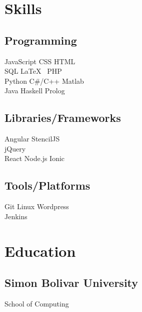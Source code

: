 \documentclass[]{plushcv}
\begin{document}
\begin{minipage}[t]{0.25\textwidth} 


\section{Skills}

\subsection{Programming}
\sectionsep
{}
JavaScript \textbullet{} CSS \textbullet{} HTML \\
\sectionsep
{}
SQL \textbullet{} \LaTeX\ \textbullet{} PHP \\
Python \textbullet{} C\#/C++ \textbullet{} Matlab \\
\sectionsep
{}
Java \textbullet{} Haskell \textbullet{} Prolog \\
\sectionsep
\sectionsep

\subsection{Libraries/Frameworks}
\sectionsep
{}
Angular \textbullet{} StencilJS \\
\sectionsep
{}
jQuery \\
\sectionsep
{}
React \textbullet{} Node.js \textbullet{} Ionic \\
\sectionsep
\sectionsep

\subsection{Tools/Platforms}
\sectionsep
Git \textbullet{} Linux \textbullet{} Wordpress \\
Jenkins \\

\sectionsep


\section{Education} 
\subsection{Simon Bolivar University}
School of Computing \\
\sectionsep


\end{minipage}
\end{document}
